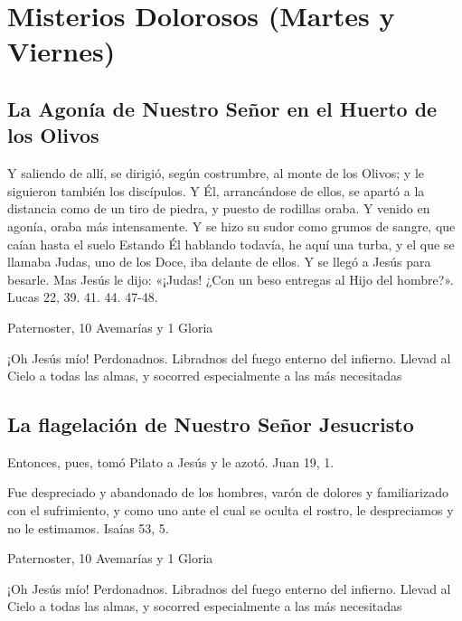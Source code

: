 \documentclass[a4paper,11pt, oneside]{report}
\begin{document}
      \newpage

    \section{Misterios Dolorosos (Martes y Viernes)}
      
      \subsection{La Agonía de Nuestro Señor en el Huerto de los Olivos}
        Y saliendo de allí, se dirigió, según costrumbre, al monte de los Olivos; y le siguieron también los discípulos.
        Y Él, arrancándose de ellos, se apartó a la distancia como de un tiro de piedra, y puesto de rodillas oraba. 
        Y venido en agonía, oraba más intensamente. Y se hizo su sudor como grumos de sangre, que caían hasta el suelo
        Estando Él hablando todavía, he aquí una turba, y el que se llamaba Judas, uno de los Doce, iba delante de ellos. Y se llegó a Jesús para besarle.
        Mas Jesús le dijo: «¡Judas! ¿Con un beso entregas al Hijo del hombre?». Lucas 22, 39. 41. 44. 47-48\cite{bover-cantera}.

        \smallskip
         Paternoster, 10 Avemarías y 1 Gloria
        
        \smallskip
        ¡Oh Jesús mío! Perdonadnos. Libradnos del fuego enterno del infierno. Llevad al Cielo a todas las almas, y socorred especialmente a las más 
        necesitadas
      
      \subsection{La flagelación de Nuestro Señor Jesucristo}
        Entonces, pues, tomó Pilato a Jesús y le azotó. Juan 19, 1\cite{bover-cantera}.
        
        \smallskip
        Fue despreciado y abandonado de los hombres, varón de dolores y familiarizado con el sufrimiento, y como uno ante el cual
        se oculta el rostro, le despreciamos y no le estimamos. Isaías 53, 5\cite{bover-cantera}.
        
        \smallskip
         Paternoster, 10 Avemarías y 1 Gloria
        
        \smallskip
        ¡Oh Jesús mío! Perdonadnos. Libradnos del fuego enterno del infierno. Llevad al Cielo a todas las almas, y socorred especialmente a las más 
        necesitadas
      
\end{document}
